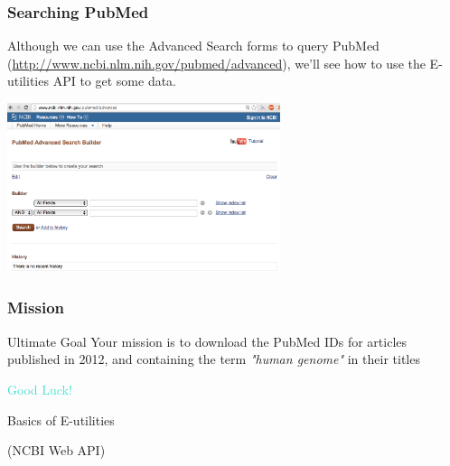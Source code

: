 \documentclass{beamer}\usepackage[]{graphicx}\usepackage[]{color}
\begin{document}

\begin{frame}
\frametitle{Searching PubMed}

Although we can use the Advanced Search forms to query PubMed {\scriptsize (\url{http://www.ncbi.nlm.nih.gov/pubmed/advanced}}), we'll see how to use the E-utilities API to get some data. 

\begin{center}
\includegraphics[width=8cm]{images/pubmed_search.png}
\end{center}

\end{frame}


\begin{frame}
\frametitle{Mission}

\begin{block}{Ultimate Goal}
Your mission is to download the PubMed IDs for articles published in 2012, and containing the term \textit{"human genome"} in their titles 
\end{block}

\begin{center}
\textcolor{turquoise}{Good Luck!}
\end{center}

\end{frame}


\begin{frame}
 \begin{center}
  {\Huge \textcolor{mandarina}{Basics of E-utilities}}
  
  \vspace{2mm}
  {\Large \textcolor{mandarina}{(NCBI Web API)}}
 \end{center}
\end{frame}

\end{document}
